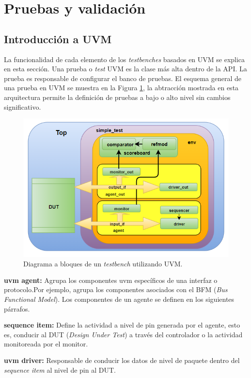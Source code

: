 \documentclass[a4paper]{article}
\begin{document}
\section{Pruebas y validación}

\subsection{Introducción a UVM}

La funcionalidad de cada elemento de los \textit{testbenches} basados en UVM se explica en esta sección. Una prueba o \textit{test} UVM es la clase más alta dentro de la API. La prueba es responsable de configurar el banco de pruebas. El esquema general de una prueba en UVM se muestra en la Figura \ref{uvm_tb}, la abtracción mostrada en esta arquitectura permite la definición de pruebas a bajo o alto nivel sin cambios significativo.

\begin{figure}[h]
  \centering  
  \includegraphics[width=0.8\linewidth]{pictures/uvm.png}
  \caption{Diagrama a bloques de un \textit{testbench} utilizando UVM.}
  \label{uvm_tb}
\end{figure}

\textbf{uvm agent:} Agrupa los componentes uvm específicos de una interfaz o protocolo.Por ejemplo, agrupa los componentes asociados con el BFM (\textit{Bus Functional Model}). Los componentes de un agente se definen en los siguientes párrafos.

\textbf{sequence item:} Define la actividad a nivel de pin generada por el agente, esto es, conducir al DUT (\textit{Design Under Test}) a través del controlador o la actividad monitoreada por el monitor.

\textbf{uvm driver:} Responsable de conducir los datos de nivel de paquete dentro del \textit{sequence item} al nivel de pin al DUT.
\end{document}
